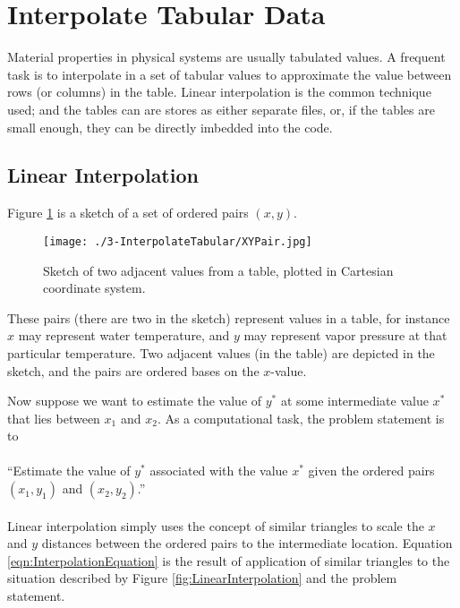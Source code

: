 \section{Interpolate Tabular Data}
Material properties in physical systems are usually tabulated values.
A frequent task is to interpolate in a set of tabular values to approximate the value between rows (or columns) in the table.  
Linear interpolation is the common technique used; and the tables can are stores as either separate files, or, if the tables are small enough, they can be directly imbedded into the code.

\subsection{Linear Interpolation}
Figure \ref{fig:XYPair} is a sketch of a set of ordered pairs $(x,y)$. 

\begin{figure}[h!] %
   \centering
   \texttt{[image: ./3-InterpolateTabular/XYPair.jpg]} 
   \caption{Sketch of two adjacent values from a table, plotted in Cartesian coordinate system.}
   \label{fig:XYPair}
\end{figure}

These pairs (there are two in the sketch) represent values in a table, for instance $x$ may represent water temperature, and $y$ may represent vapor pressure at that particular temperature.
Two adjacent values (in the table) are depicted in the sketch, and the pairs are ordered bases on the $x$-value.  

Now suppose we want to estimate the value of $y^*$ at some intermediate value $x^*$ that lies between $x_1$ and $x_2$.
As a computational task, the problem statement is to\\~\\
``Estimate the value of $y^*$ associated with the value $x^*$ given the ordered pairs $(x_1,y_1)$ and $(x_2,y_2)$.'' \\~\\
Linear interpolation simply uses the concept of similar triangles to scale the $x$ and $y$ distances between the ordered pairs to the intermediate location.   Equation \ref{eqn:InterpolationEquation} is the result of application of similar triangles to the situation described by Figure \ref{fig:LinearInterpolation} and the problem statement.

